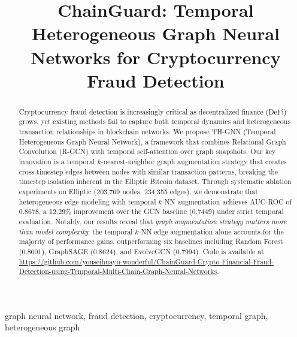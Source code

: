 \documentclass[conference]{IEEEtran}
\newcommand{\ours}{TH-GNN}
\begin{document}
\title{ChainGuard: Temporal Heterogeneous Graph Neural Networks for Cryptocurrency Fraud Detection}

\author{
}

\maketitle

\begin{abstract}
Cryptocurrency fraud detection is increasingly critical as decentralized finance (DeFi) grows, yet existing methods fail to capture both temporal dynamics and heterogeneous transaction relationships in blockchain networks. We propose \ours{} (Temporal Heterogeneous Graph Neural Network), a framework that combines Relational Graph Convolution (R-GCN) with temporal self-attention over graph snapshots. Our key innovation is a temporal $k$-nearest-neighbor graph augmentation strategy that creates cross-timestep edges between nodes with similar transaction patterns, breaking the timestep isolation inherent in the Elliptic Bitcoin dataset. Through systematic ablation experiments on Elliptic (203,769 nodes, 234,355 edges), we demonstrate that heterogeneous edge modeling with temporal $k$-NN augmentation achieves AUC-ROC of 0.8678, a 12.29\% improvement over the GCN baseline (0.7449) under strict temporal evaluation. Notably, our results reveal that \emph{graph augmentation strategy matters more than model complexity}: the temporal $k$-NN edge augmentation alone accounts for the majority of performance gains, outperforming six baselines including Random Forest (0.8601), GraphSAGE (0.8624), and EvolveGCN (0.7994). Code is available at \url{https://github.com/youseihuayu-wonderful/ChainGuard-Crypto-Financial-Fraud-Detection-using-Temporal-Multi-Chain-Graph-Neural-Networks}.
\end{abstract}

\begin{IEEEkeywords}
graph neural network, fraud detection, cryptocurrency, temporal graph, heterogeneous graph
\end{IEEEkeywords}










\end{document}
